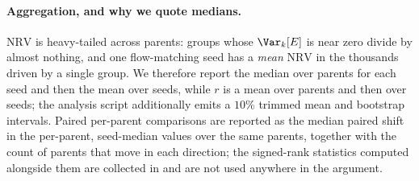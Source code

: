 \paragraph{Aggregation, and why we quote medians.} $\mathrm{NRV}$ is heavy-tailed
across parents: groups whose $\Var_k[E]$ is near zero divide by almost nothing, and
one flow-matching seed has a \emph{mean} $\mathrm{NRV}$ in the thousands driven by a
single group. We therefore report the median over parents for each seed and then the
mean over seeds, while $r$ is a mean over parents and then over seeds; the analysis
script additionally emits a $10\%$ trimmed mean and bootstrap intervals. Paired
per-parent comparisons are reported as the median paired shift in the per-parent,
seed-median values over the same parents, together with the count of parents that move
in each direction; the signed-rank statistics computed alongside them are collected in
 and are not used anywhere in the argument.

